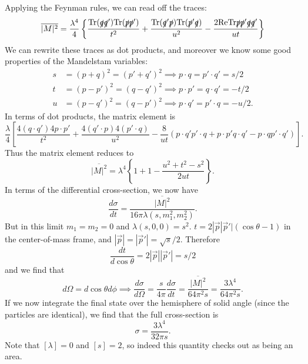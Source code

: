 Applying the Feynman rules, we can read off the traces:
$$\overline{|M|^2}=\frac{\lambda^4}{4}\left\{\frac{\text{Tr}(\slashed q \slashed q')\text{Tr}(\slashed p \slashed p')}{t^2}+
\frac{\text{Tr}(\slashed q' \slashed p)\text{Tr}(\slashed p' \slashed q)}{u^2}
-\frac{2\text{Re}\text{Tr}\slashed p \slashed p' \slashed q \slashed q'}{ut}\right\}$$
We can rewrite these traces as dot products, and moreover we know some good properties of the Mandelstam variables:
\begin{align*}
    s&=(p+q)^2=(p'+q')^2 \implies p\cdot q = p'\cdot q'=s/2\\
    t&=(p-p')^2=(q-q')^2 \implies p\cdot p' = q\cdot q' =-t/2\\
    u&=(p-q')^2=(q-p')^2 \implies p\cdot q'=p'\cdot q=-u/2.
\end{align*}
In terms of dot products, the matrix element is
$$\frac{\lambda}{4}\left[\frac{4(q\cdot q')4 p \cdot p'}{t^2}+\frac{4(q'\cdot p)4(p'\cdot q)}{u^2}-\frac{8}{ut}(p\cdot q' p'\cdot q+p\cdot p' q \cdot q' -p\cdot q p'\cdot q')\right].$$
Thus the matrix element reduces to
$$\overline{|M|^2}=\lambda^4\left\{1+1-\frac{u^2+t^2-s^2}{2ut}\right\}.$$
In terms of the differential cross-section, we now have
$$\frac{d\sigma}{dt}=\frac{\overline{|M|^2}}{16\pi \lambda(s,m_1^2,m_2^2)}.$$
But in this limit $m_1=m_2=0$ and $\lambda(s,0,0)=s^2$. $t=2|\vec p| \vec p'|(\cos\theta-1)$ in the center-of-mass frame, and $|\vec p|=|\vec p'|=\sqrt{s}/2.$ Therefore
$$\frac{dt}{d\cos\theta}=2|\vec p||\vec p'|=s/2$$ and we find that
$$d\Omega = d\cos\theta d\phi \implies \frac{d\sigma}{d\Omega}=\frac{s}{4\pi}\frac{d\sigma}{dt}=\frac{\overline{|M|^2}}{64\pi^2 s}=\frac{3\lambda^4}{64\pi^2 s}.$$
If we now integrate the final state over the hemisphere of solid angle (since the particles are identical), we find that the full cross-section is
$$\sigma=\frac{3\lambda^4}{32\pi s}.$$
Note that $[\lambda]=0$ and $[s]=2$, so indeed this quantity checks out as being an area.